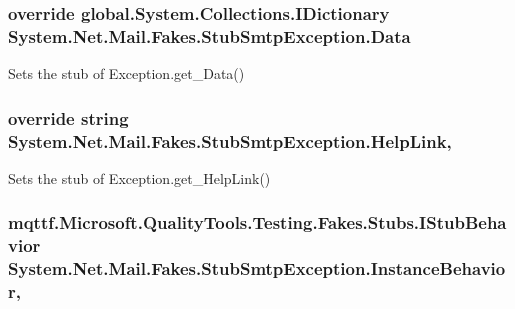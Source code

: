 \hypertarget{class_system_1_1_net_1_1_mail_1_1_fakes_1_1_stub_smtp_exception_a9d298a8a7831c4b5eb64c58450ea6354}{
\subsubsection[{Data}]{\setlength{\rightskip}{0pt plus 5cm}override global.\-System.\-Collections.\-I\-Dictionary System.\-Net.\-Mail.\-Fakes.\-Stub\-Smtp\-Exception.\-Data\hspace{0.3cm}{\ttfamily [get]}}}\label{class_system_1_1_net_1_1_mail_1_1_fakes_1_1_stub_smtp_exception_a9d298a8a7831c4b5eb64c58450ea6354}


Sets the stub of Exception.\-get\-\_\-\-Data()

\hypertarget{class_system_1_1_net_1_1_mail_1_1_fakes_1_1_stub_smtp_exception_aa5a4d890e41b5c2509e0fd24ac7fe00c}{
\subsubsection[{Help\-Link}]{\setlength{\rightskip}{0pt plus 5cm}override string System.\-Net.\-Mail.\-Fakes.\-Stub\-Smtp\-Exception.\-Help\-Link\hspace{0.3cm}{\ttfamily [get]}, {\ttfamily [set]}}}\label{class_system_1_1_net_1_1_mail_1_1_fakes_1_1_stub_smtp_exception_aa5a4d890e41b5c2509e0fd24ac7fe00c}


Sets the stub of Exception.\-get\-\_\-\-Help\-Link()

\hypertarget{class_system_1_1_net_1_1_mail_1_1_fakes_1_1_stub_smtp_exception_a3e467347457820da33172eae39106415}{
\subsubsection[{Instance\-Behavior}]{\setlength{\rightskip}{0pt plus 5cm}mqttf.\-Microsoft.\-Quality\-Tools.\-Testing.\-Fakes.\-Stubs.\-I\-Stub\-Behavior System.\-Net.\-Mail.\-Fakes.\-Stub\-Smtp\-Exception.\-Instance\-Behavior\hspace{0.3cm}{\ttfamily [get]}, {\ttfamily [set]}}}\label{class_system_1_1_net_1_1_mail_1_1_fakes_1_1_stub_smtp_exception_a3e467347457820da33172eae39106415}


